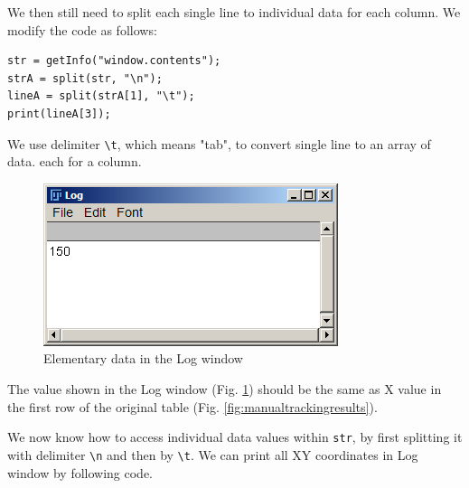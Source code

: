 \documentclass[11pt,a4paper,oneside]{report}
\newcommand{\ilcom}[1]{\texttt{\small#1}}
\begin{document}
We then still need to split each single line to individual data for each column. We modify the code as follows:
\begin{lstlisting}[numbers=none, morekeywords={*, split}]
str = getInfo("window.contents");
strA = split(str, "\n");
lineA = split(strA[1], "\t");
print(lineA[3]);
\end{lstlisting}

We use delimiter \ilcom{\textbackslash{}t}, which means "tab", to convert single line to an array of data. each for a column. 
\begin{figure}[htbp]
\begin{center}
\includegraphics[scale=0.6]{fig/fig253_XfirstlineValue.png}
\caption{Elementary data in the Log window}
\label{fig:doublesplittedLine}
\end{center}
\end{figure}

The value shown in the Log window (Fig. \ref{fig:doublesplittedLine}) should be the same as X value in the first row of the original table (Fig. \ref{fig:manualtrackingresults}). 

We now know how to access individual data values within \ilcom{str}, by first splitting it with delimiter  \ilcom{\textbackslash{}n} and then by  \ilcom{\textbackslash{}t}. We can print all XY coordinates in Log window by following code.  


\end{document}
